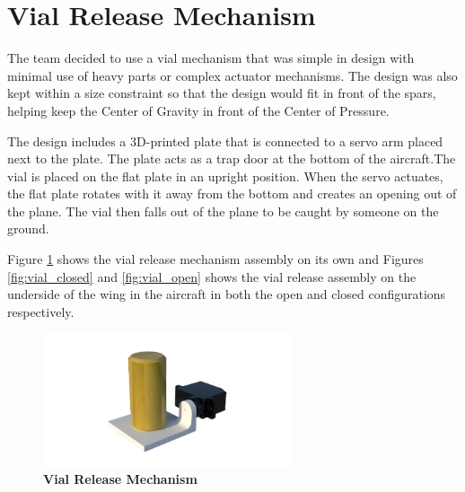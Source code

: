 \section{Vial Release Mechanism}

        The team decided to use a vial mechanism that was simple in design with minimal use of heavy parts or complex actuator mechanisms. The design was also kept within a size constraint so that the design would fit in front of the spars, helping keep the Center of Gravity in front of the Center of Pressure. 
        
        The design includes a 3D-printed plate that is connected to a servo arm placed next to the plate. The plate acts as a trap door at the bottom of the aircraft.The vial is placed on the flat plate in an upright position. When the servo actuates, the flat plate rotates with it away from the bottom and creates an opening out of the plane. The vial then falls out of the plane to be caught by someone on the ground.
        
        Figure \ref{fig:vial_assembly} shows the vial release mechanism assembly on its own and Figures \ref{fig:vial_closed} and \ref{fig:vial_open} shows the vial release assembly on the underside of the wing in the aircraft in both the open and closed configurations respectively.
        
        \begin{figure}[H]
            \centering
            \includegraphics[width=0.65\textwidth]{homeworks/homework4/report/Figure/assembly_vial_door.png}
            \caption{\textbf{Vial Release Mechanism}}
            \label{fig:vial_assembly}
        \end{figure}
                
